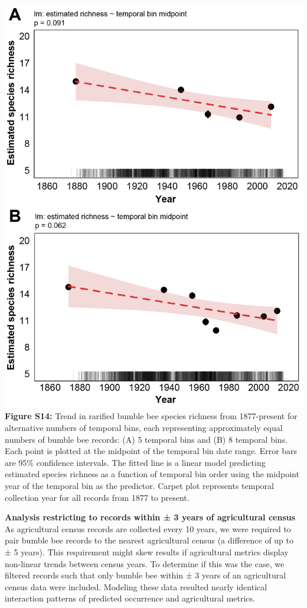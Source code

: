 \documentclass[11pt,]{article}
\begin{document}
\includegraphics[width=1\textwidth,height=\textheight]{../ms_figs/fig_s14.png}
\textbf{Figure S14:} Trend in rarified bumble bee species richness from
1877-present for alternative numbers of temporal bins, each representing
approximately equal numbers of bumble bee records: (A) 5 temporal bins
and (B) 8 temporal bins. Each point is plotted at the midpoint of the
temporal bin date range. Error bars are 95\% confidence intervals. The
fitted line is a linear model predicting estimated species richness as a
function of temporal bin order using the midpoint year of the temporal
bin as the predictor. Carpet plot represents temporal collection year
for all records from 1877 to present. \clearpage

\newpage

\textbf{Analysis restricting to records within ± 3 years of agricultural
census} As agricultural census records are collected every 10 years, we
were required to pair bumble bee records to the nearest agricultural
census (a difference of up to ± 5 years). This requirement might skew
results if agricultural metrics display non-linear trends between census
years. To determine if this was the case, we filtered records such that
only bumble bee within ± 3 years of an agricultural census data were
included. Modeling these data resulted nearly identical interaction
patterns of predicted occurrence and agricultural metrics.
\end{document}
